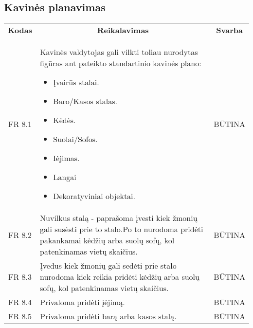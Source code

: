 \documentclass{VUMIFPSkursinis}
\begin{document}
\subsection{Kavinės planavimas}
\begin{center}
	\begin{table}[H]
	\begin{tabular}{|p{2cm}|p{}|p{}|}
	
	\hline
	    \rowcolor{lightgray}
		\multicolumn{3}{|c|}{Kavinės planavimas}\\
		
	\hline
		\multicolumn{1}{|c|}{{\bfseries Kodas}}&
		\multicolumn{1}{|c|}{{\bfseries Reikalavimas}}&
		\multicolumn{1}{|c|}{{\bfseries Svarba}}\\

	\hline
		\multicolumn{1}{|c|}{FR 8.1}&
		{Kavinės valdytojas gali vilkti toliau nurodytas figūras ant pateikto standartinio kavinės plano:
		\begin{itemize}
			\item Įvairūs stalai.
			\item Baro/Kasos stalas.
			\item Kėdės.
			\item Suolai/Sofos.
			\item Iėjimas.
			\item Langai
			\item Dekoratyviniai objektai.
		\end{itemize}}&
		\multicolumn{1}{|c|}{BŪTINA}\\

	\hline
	
		\multicolumn{1}{|c|}{FR 8.2}&
		{Nuvilkus stalą - paprašoma įvesti kiek žmonių gali susėsti prie to stalo.Po to nurodoma pridėti pakankamai kėdžių arba suolų sofų, kol patenkinamas vietų skaičius.}&
		\multicolumn{1}{|c|}{BŪTINA}\\				
	\hline
	
		\multicolumn{1}{|c|}{FR 8.3}&
		{Įvedus kiek žmonių gali sedėti prie stalo nurodoma kiek reikia pridėti kėdžių arba suolų sofų, kol patenkinamas vietų skaičius.}&
		\multicolumn{1}{|c|}{BŪTINA}\\				
	\hline
	
		\multicolumn{1}{|c|}{FR 8.4}&
		{Privaloma pridėti įėjimą.}&
		\multicolumn{1}{|c|}{BŪTINA}\\				
	\hline
	
		\multicolumn{1}{|c|}{FR 8.5}&
		{Privaloma pridėti barą arba kasos stalą.}&
		\multicolumn{1}{|c|}{BŪTINA}\\				
	\hline
	

\end{tabular}
\end{table}
\end{center}
\end{document}

